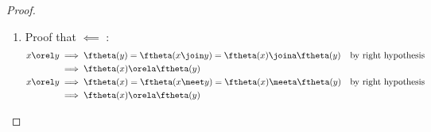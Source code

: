 \begin{proof}
\begin{enumerate}
\begin{enumerate}
\begin{enumerate}
        \item Let $v_1\eqd\ftheta(x_1)$ and $v_2\eqd\ftheta(x_2)$. \label{item:lat_iso_meet_v1v2}
        \item We can then finish the proof of :
          \begin{align*}
            \ftheta(x_1\meet x_2)
              &= \ftheta\brs{\ftheti\ftheta(x_1) \meet \ftheti\ftheta(x_2)}
            \\&= \ftheta\brs{\ftheti(v_1) \meet \ftheti(v_2)}
              && \text{by \pref{item:lat_iso_meet_v1v2}}
            \\&\orelad v_1 \meeta v_2
              && \text{by \pref{item:lat_iso_meet_y1y2}}
            \\&= \ftheta(x_1) \meeta \ftheta(x_2)
              && \text{by \pref{item:lat_iso_meet_v1v2}}
          \end{align*}
      \end{enumerate}

    \item And so, combining  and , we have
      \[ \brbr{\begin{array}{rclDD}
           \ftheta(x_1\meet x_2) &\orela  & \ftheta(x_1)\meeta\ftheta(x_2) & \xref{item:lat_iso_meet_le} & and \\
           \ftheta(x_1\meet x_2) &\orelad & \ftheta(x_1)\meeta\ftheta(x_2) & \xref{item:lat_iso_meet_ge} &
         \end{array}}
         \qquad\implies\qquad
         \ftheta(x_1\meet x_2) =\ftheta(x_1)\meeta\ftheta(x_2)
      \]

  \end{enumerate}


\item Proof that  $\impliedby$ :
  \begin{align*}
    x \orel y
      &\implies \ftheta(y) = \ftheta(x \join y) = \ftheta(x) \joina \ftheta(y)
      && \text{by right hypothesis}
    \\&\implies \ftheta(x) \orela \ftheta(y)
    \\
    x \orel y
      &\implies \ftheta(x) = \ftheta(x \meet y) = \ftheta(x) \meeta \ftheta(y)
      && \text{by right hypothesis}
    \\&\implies \ftheta(x) \orela \ftheta(y)
  \end{align*}

\end{enumerate}

\end{proof}


